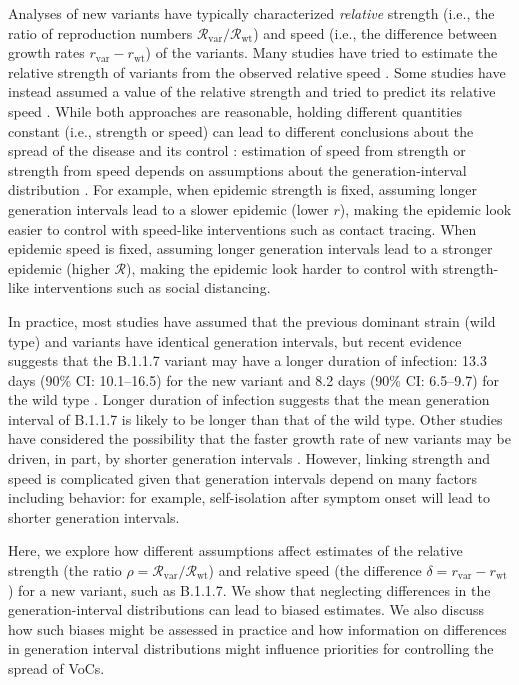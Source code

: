 \documentclass[12pt]{article}
\newcommand{\vvvar}{\mathrm{var}}
\newcommand{\wwwt}{\mathrm{wt}}
\newcommand{\rx}[1]{\ensuremath{{r}_{#1}}\xspace}
\newcommand{\rw}{\rx{\wwwt}}
\newcommand{\rv}{\rx{\vvvar}}
\newcommand{\Rx}[1]{\ensuremath{{\mathcal R}_{#1}}\xspace}
\newcommand{\RR}{\ensuremath{{\mathcal R}}\xspace}
\newcommand{\Rw}{\Rx{\wwwt}}
\newcommand{\Rv}{\Rx{\vvvar}}
\begin{document}
Analyses of new variants have typically characterized \emph{relative} strength (i.e., the ratio of reproduction numbers $\Rv/\Rw$) and speed (i.e., the difference between growth rates $\rv-\rw$) of the variants.
Many studies have tried to estimate the relative strength of variants from the observed relative speed \citep{davies2021estimated, leung2021early, volz2021transmission,zhao2021}.
Some studies have instead assumed a value of the relative strength and tried to predict its relative speed \citep{davies2021estimated,di2021impact}.
While both approaches are reasonable, holding different quantities constant (i.e., strength or speed) can lead to different conclusions about the spread of the disease and its control \citep{doi:10.1098/rspb.2020.1556}:
estimation of speed from strength or strength from speed depends on assumptions about the generation-interval distribution \citep{roberts2007model,svensson2007note,wallinga2007generation}.
For example, when epidemic strength is fixed, assuming longer generation intervals lead to a slower epidemic (lower $r$), making the epidemic look easier to control with speed-like interventions such as contact tracing.
When epidemic speed is fixed, assuming longer generation intervals lead to a stronger epidemic (higher $\RR$), making the epidemic look harder to control with strength-like interventions such as social distancing.

In practice, most studies have assumed that the previous dominant strain (wild type) and variants have identical generation intervals, but recent evidence suggests that the B.1.1.7 variant may have a longer duration of infection: 13.3 days (90\% CI: 10.1--16.5) for the new variant and 8.2 days (90\% CI: 6.5--9.7) for the wild type \citep{kissler2021densely}.
Longer duration of infection suggests that the mean generation interval of B.1.1.7 is likely to be longer than that of the wild type.
Other studies have considered the possibility that the faster growth rate of new variants may be driven, in part, by shorter generation intervals \citep{davies2021estimated,volz2021transmission}.
However, linking strength and speed is complicated given that generation intervals depend on many factors including behavior:
for example, self-isolation after symptom onset will lead to shorter generation intervals.

Here, we explore how different assumptions affect estimates of the relative strength (the ratio $\rho=\Rv/\Rw$) and relative speed (the difference $\delta=\rv-\rw$) for a new variant, such as B.1.1.7.
We show that neglecting differences in the generation-interval distributions can lead to biased estimates.
We also discuss how such biases might be assessed in practice and how information on differences in generation interval distributions might influence priorities for controlling the spread of VoCs.
\end{document}
